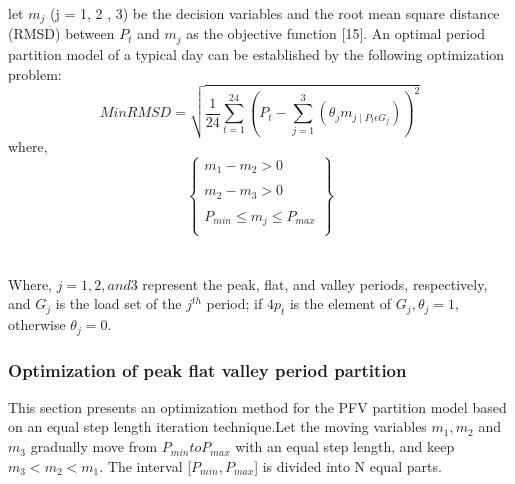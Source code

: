\documentclass[12pt]{article}
\begin{document}
let $m_{j}$ (j = 1,  2 , 3) be the decision variables and the root mean square distance
(RMSD) between $P_{t}$ and $m_{j}$ as the objective function [15]. An optimal period
partition model of a typical day can be established by the following optimization
problem:\\
\begin{equation}
MinRMSD=\sqrt{\frac{1}{24}\sum_{t=1}^{24}(P_{t}-\sum_{j=1}^{3}(\theta_{j}m_{j\mid P_{t} \epsilon G_{j}}))^{2}}
\end{equation}
where, \\
\begin{equation}
\left\lbrace
\begin{array}{c}
m_{1}-m_{2}>0 \\ \\
m_{2}-m_{3}>0\\ \\
P_{min}\leq m_{j} \leq P_{max}\\
\end{array}
\right\rbrace
\end{equation}
\\\\
Where, $j = 1,2, and 3$ represent the peak, flat, and valley periods, respectively, and $G_{j}$  is the load set of the  $j^{th}$ period; if  $4p_{t}$ is the element  of  $G_{j},\theta_{j} = 1$, otherwise $\theta_{j} = 0 .$\\
\bigskip
\subsubsection{Optimization of peak flat valley period partition}
This section presents an optimization method for the PFV partition model based
on an equal step length iteration technique.Let the moving variables $m_{1}, m_{2}$ and $m_{3}$ gradually move from  $P_{min} to P_{max} $ with an equal step length, and keep $m_{3}<m_{2}<m_{1}$. The interval [$P_{min},P_{max}$] is divided into N equal parts.\\
\end{document}
